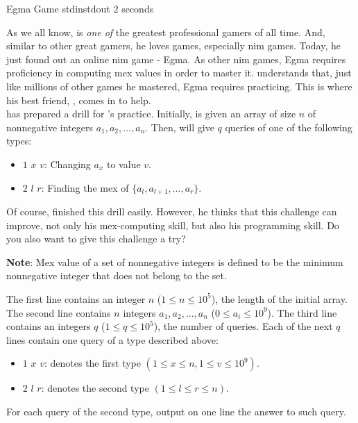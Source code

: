 \begin{problem}{Egma Game}
{stdin}{stdout}
{2 seconds}{}{}

As we all know, \TiChuot is \textit{one of} the greatest professional gamers of all time. And, similar to other great gamers, he loves games,
especially nim games. Today, he just found out an online nim game - Egma. As other nim games, Egma requires proficiency in computing mex values
in order to master it. \TiChuot understands that, just like millions of other games he mastered, Egma requires practicing. This is where his
best friend, \T, comes in to help.\\

\T has prepared a drill for \TiChuot's practice. Initially, \TiChuot is given an array of size $n$ of nonnegative integers $a_1, a_2, ..., a_n$.
Then, \T will give \TiChuot $q$ queries of one of the following types:
    \begin{itemize}
        \item
        $1$ $x$ $v$: Changing $a_x$ to value $v$.
        \item
        $2$ $l$ $r$: Finding the mex of $\{a_l, a_{l + 1}, ..., a_r\}$.
    \end{itemize}
Of course, \TiChuot finished this drill easily. However, he thinks that this challenge can improve, not only his mex-computing skill, but also
his programming skill. Do you also want to give this challenge a try?

\textbf{Note}: Mex value of a set of nonnegative integers is defined to be the minimum nonnegative integer that does not belong to the set.

\InputFile
The first line contains an integer $n$ ($1 \leq n \leq 10^5$), the length of the initial array. The second line contains $n$ integers $a_1, 
a_2, ..., a_n$ ($0 \leq a_i \leq 10^9$). The third line contains an integers $q$ ($1 \leq q \leq 10^5$), the number of queries. Each of the
next $q$ lines contain one query of a type described above:
    \begin{itemize}
        \item
        $1$ $x$ $v$: denotes the first type $(1 \leq x \leq n, 1 \leq v \leq 10^9)$.
        \item
        $2$ $l$ $r$: denotes the second type $(1 \leq l \leq r \leq n)$.
    \end{itemize}

\OutputFile

For each query of the second type, output on one line the answer to such query.

\Examples

\begin{example}
%
\end{example}

\end{problem}
